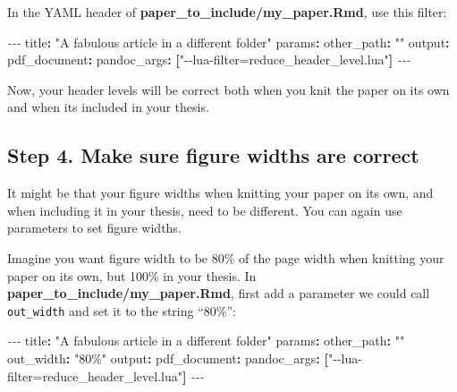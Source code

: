 \documentclass[a4paper, nobind]{templates/ociamthesis}
\newenvironment{Shaded}{\begin{snugshade}}{\end{snugshade}}
\newcommand{\AttributeTok}[1]{\textcolor[rgb]{0.77,0.63,0.00}{#1}}
\newcommand{\FunctionTok}[1]{\textcolor[rgb]{0.00,0.00,0.00}{#1}}
\newcommand{\KeywordTok}[1]{\textcolor[rgb]{0.13,0.29,0.53}{\textbf{#1}}}
\newcommand{\PreprocessorTok}[1]{\textcolor[rgb]{0.56,0.35,0.01}{\textit{#1}}}
\newcommand{\StringTok}[1]{\textcolor[rgb]{0.31,0.60,0.02}{#1}}
\renewenvironment{Shaded}
{
  \vspace{10pt}%
  \begin{snugshade}%
}{%
  \end{snugshade}%
  \vspace{8pt}%
}
\begin{document}
In the YAML header of \textbf{paper\_to\_include/my\_paper.Rmd}, use this filter:

\begin{Shaded}
\begin{Highlighting}[]
\PreprocessorTok{{-}{-}{-}}
\FunctionTok{title}\KeywordTok{:}\AttributeTok{ }\StringTok{"A fabulous article in a different folder"}
\FunctionTok{params}\KeywordTok{:}
\AttributeTok{  }\FunctionTok{other\_path}\KeywordTok{:}\AttributeTok{ }\StringTok{""}
\FunctionTok{output}\KeywordTok{:}
\AttributeTok{  }\FunctionTok{pdf\_document}\KeywordTok{:}\AttributeTok{ }
\AttributeTok{    }\FunctionTok{pandoc\_args}\KeywordTok{:}\AttributeTok{ }\KeywordTok{[}\StringTok{"{-}{-}lua{-}filter=reduce\_header\_level.lua"}\KeywordTok{]}
\PreprocessorTok{{-}{-}{-}}
\end{Highlighting}
\end{Shaded}

Now, your header levels will be correct both when you knit the paper on its own and when its included in your thesis.

\hypertarget{step-4.-make-sure-figure-widths-are-correct}{%
\subsection{Step 4. Make sure figure widths are correct}\label{step-4.-make-sure-figure-widths-are-correct}}

It might be that your figure widths when knitting your paper on its own, and when including it in your thesis, need to be different.
You can again use parameters to set figure widths.

Imagine you want figure width to be 80\% of the page width when knitting your paper on its own, but 100\% in your thesis.
In \textbf{paper\_to\_include/my\_paper.Rmd}, first add a parameter we could call \texttt{out\_width} and set it to the string ``80\%'':

\begin{Shaded}
\begin{Highlighting}[]
\PreprocessorTok{{-}{-}{-}}
\FunctionTok{title}\KeywordTok{:}\AttributeTok{ }\StringTok{"A fabulous article in a different folder"}
\FunctionTok{params}\KeywordTok{:}
\AttributeTok{  }\FunctionTok{other\_path}\KeywordTok{:}\AttributeTok{ }\StringTok{""}
\AttributeTok{  }\FunctionTok{out\_width}\KeywordTok{:}\AttributeTok{ }\StringTok{"80\%"}
\FunctionTok{output}\KeywordTok{:}
\AttributeTok{  }\FunctionTok{pdf\_document}\KeywordTok{:}\AttributeTok{ }
\AttributeTok{    }\FunctionTok{pandoc\_args}\KeywordTok{:}\AttributeTok{ }\KeywordTok{[}\StringTok{"{-}{-}lua{-}filter=reduce\_header\_level.lua"}\KeywordTok{]}
\PreprocessorTok{{-}{-}{-}}
\end{Highlighting}
\end{Shaded}
\end{document}

